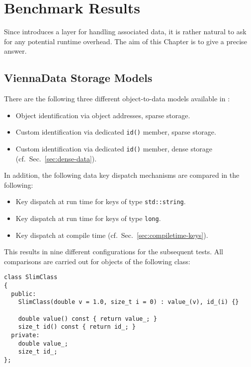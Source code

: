\chapter{Benchmark Results} \label{chap:benchmarks}
Since {\ViennaData} introduces a layer for handling associated data, it is rather
natural to ask for any potential runtime overhead. The aim of this
Chapter is to give a precise answer.

\section{ViennaData Storage Models}
There are the following three different object-to-data models available in {\ViennaData}:
\begin{itemize}
 \item Object identification via object addresses, sparse storage.
 \item Custom identification via dedicated \lstinline|id()| member, sparse storage.
 \item Custom identification via dedicated \lstinline|id()| member, dense storage (cf.~Sec.~\ref{sec:dense-data}).
\end{itemize}
In addition, the following data key dispatch mechanisms are compared in the following:
\begin{itemize}
 \item Key dispatch at run time for keys of type \lstinline|std::string|.
 \item Key dispatch at run time for keys of type \lstinline|long|.
 \item Key dispatch at compile time (cf.~Sec.~\ref{sec:compiletime-keys}).
\end{itemize}
This results in nine different configurations for the subsequent tests. All comparisons are carried out for objects of the following class:
\begin{lstlisting}
class SlimClass
{
  public:
    SlimClass(double v = 1.0, size_t i = 0) : value_(v), id_(i) {}
    
    double value() const { return value_; }
    size_t id() const { return id_; }
  private:
    double value_;
    size_t id_;
};
\end{lstlisting}

